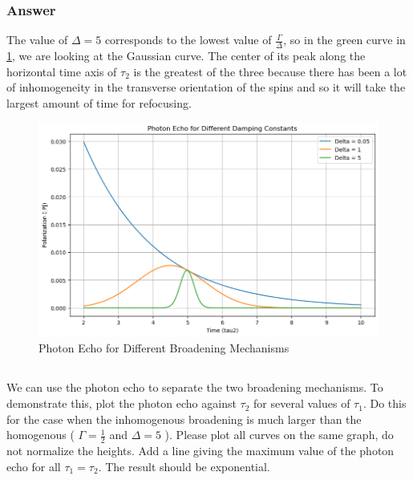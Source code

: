 \documentclass[12pt]{article}
\begin{document}
\subsubsection{Answer}
The value of $\Delta =5$ corresponds to the lowest value of $\frac{\Gamma }{\Delta }$, so in the green curve in \ref{fig:echo}, we are looking at the Gaussian curve. The center of its peak along the horizontal time axis of $\tau_2$ is the greatest of the three because there has been a lot of inhomogeneity in the transverse orientation of the spins and so it will take the largest amount of time for refocusing.
\begin{figure}
  \centering
  \includegraphics[max width=\textwidth]{p3a.png}
  \caption{Photon Echo for Different Broadening Mechanisms}
  \label{fig:echo}
\end{figure}
\subsection{}

We can use the photon echo to separate the two broadening mechanisms. To demonstrate this, plot the photon echo against $\tau_{2}$ for several values of $\tau_{1}$. Do this for the case when the inhomogenous broadening is much larger than the homogenous ( $\Gamma=\frac{1}{2}$ and $\Delta=5$ ). Please plot all curves on the same graph, do not normalize the heights. Add a line giving the maximum value of the photon echo for all $\tau_{1}=\tau_{2}$. The result should be exponential.
\end{document}
